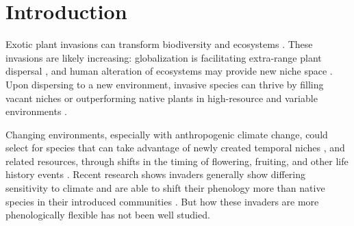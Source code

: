 \documentclass[11pt]{article}\usepackage[]{graphicx}\usepackage[]{color}
\begin{document}
	\section{Introduction} 
	Exotic plant invasions  can transform biodiversity and ecosystems \parencite{Bellard2016, Pejchar2009,Mack2000}. %
These invasions are likely increasing: globalization is facilitating extra-range plant dispersal \parencite{Helmus2014}, and human alteration of ecosystems may provide new niche space \parencite{Tilman2001, Blois2013,Inouye2008,Harte2015}. Upon dispersing to a new environment, invasive species can thrive by filling vacant niches \parencite{Elton1958} or outperforming native plants in high-resource and variable environments \parencite{Davis2001,Daehler2003}. 

Changing environments, especially with anthropogenic climate change, could select for species that can take advantage of newly created temporal niches \parencite{Wolkovich2011,godoy2014}, and related resources, through shifts in the timing of flowering, fruiting, and other life history events \parencite{Franks2007}. Recent research shows invaders generally show differing sensitivity to climate \parencite{Reeb2020} and are  able to shift their phenology more than native species in their introduced communities \parencite{Wolkovich2014,Reeb2020,Zettlemoyer2019}. But how these invaders are more phenologically flexible has not been well studied. %
\end{document}
